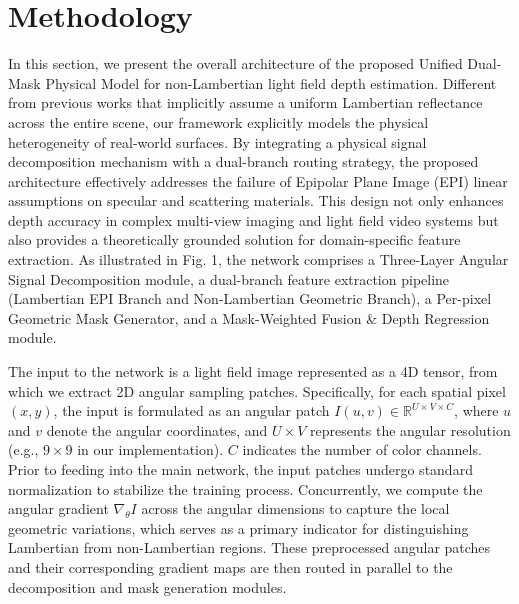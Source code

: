 \section{Methodology}

In this section, we present the overall architecture of the proposed Unified Dual-Mask Physical Model for non-Lambertian light field depth estimation. Different from previous works that implicitly assume a uniform Lambertian reflectance across the entire scene, our framework explicitly models the physical heterogeneity of real-world surfaces. By integrating a physical signal decomposition mechanism with a dual-branch routing strategy, the proposed architecture effectively addresses the failure of Epipolar Plane Image (EPI) linear assumptions on specular and scattering materials. This design not only enhances depth accuracy in complex multi-view imaging and light field video systems but also provides a theoretically grounded solution for domain-specific feature extraction. As illustrated in Fig. 1, the network comprises a Three-Layer Angular Signal Decomposition module, a dual-branch feature extraction pipeline (Lambertian EPI Branch and Non-Lambertian Geometric Branch), a Per-pixel Geometric Mask Generator, and a Mask-Weighted Fusion \& Depth Regression module.

The input to the network is a light field image represented as a 4D tensor, from which we extract 2D angular sampling patches. Specifically, for each spatial pixel $(x, y)$, the input is formulated as an angular patch $I(u,v) \in \mathbb{R}^{U \times V \times C}$, where $u$ and $v$ denote the angular coordinates, and $U \times V$ represents the angular resolution (e.g., $9 \times 9$ in our implementation). $C$ indicates the number of color channels. Prior to feeding into the main network, the input patches undergo standard normalization to stabilize the training process. Concurrently, we compute the angular gradient $\nabla_{\theta} I$ across the angular dimensions to capture the local geometric variations, which serves as a primary indicator for distinguishing Lambertian from non-Lambertian regions. These preprocessed angular patches and their corresponding gradient maps are then routed in parallel to the decomposition and mask generation modules.

